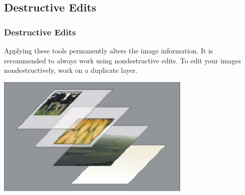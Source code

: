 \documentclass{beamer}
\begin{document}
			\subsection{Destructive Edits}		
			\begin{frame}
				\frametitle{Destructive Edits}
				\begin{outline}
					\1 Applying these tools permanently alters the image information.
					\1 It is recommended to always work using nondestructive edits.
					\1 To edit your images nondestructively, work on a duplicate layer. 
				\end{outline}
				\begin{center}
					\includegraphics[width=0.7\textwidth]{images/layers example.png}
				\end{center}	
			\end{frame}
	
\end{document}
